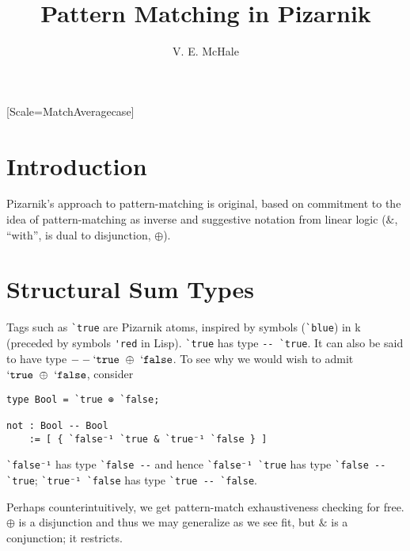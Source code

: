 \documentclass{article}
\begin{document}
\title{Pattern Matching in Pizarnik}
\author {V. E. McHale}
\maketitle

\tableofcontents

\setmonofont{DejaVu Sans Mono}[Scale=MatchAveragecase]


\section{Introduction}

Pizarnik's approach to pattern-matching is original, based on commitment to the idea of pattern-matching as inverse\cite{ehrenberg2009} and suggestive notation from linear logic ($\&$, ``with'', is dual to disjunction, $\oplus$).

\section{Structural Sum Types}

Tags such as \verb|`true| are Pizarnik atoms, inspired by symbols (\verb|`blue|) in k (preceded by symbols \verb|'red| in Lisp). \verb|`true| has type \verb|-- `true|. It can also be said to have type $-- \mathtt{`true}~\oplus~\mathtt{`false}$. To see why we would wish to admit $\mathtt{`true}~\oplus~\mathtt{`false}$, consider


\begin{verbatim}
type Bool = `true ⊕ `false;

not : Bool -- Bool
    := [ { `false⁻¹ `true & `true⁻¹ `false } ]
\end{verbatim}

\verb|`false⁻¹| has type \verb|`false --| and hence \verb|`false⁻¹ `true| has type \verb|`false -- `true|; \verb|`true⁻¹ `false| has type \verb|`true -- `false|.

Perhaps counterintuitively, we get pattern-match exhaustiveness checking for free. $\oplus$ is a disjunction and thus we may generalize as we see fit, but $\&$ is a conjunction; it restricts.
\end{document}
